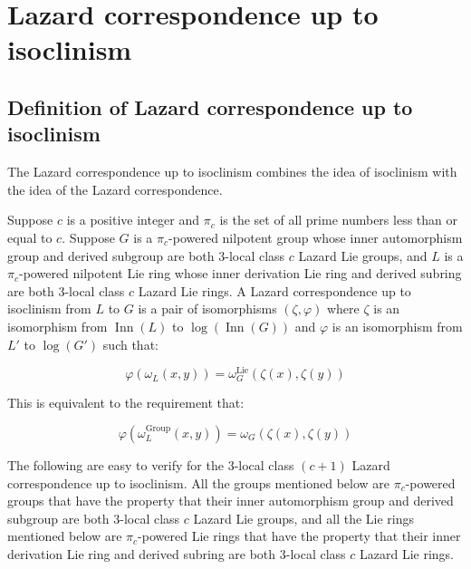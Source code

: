 
\section{Lazard correspondence up to isoclinism}\label{sec:lcuti}

\subsection{Definition of Lazard correspondence up to isoclinism}\label{sec:lcuti-def}

The Lazard correspondence up to isoclinism combines the idea of
isoclinism with the idea of the Lazard correspondence.

\begin{definer}
  Suppose $c$ is a positive integer and $\pi_c$ is the set of all
  prime numbers less than or equal to $c$. Suppose $G$ is a
  $\pi_c$-powered nilpotent group whose inner automorphism group and
  derived subgroup are both $3$-local class $c$ Lazard Lie groups, and
  $L$ is a $\pi_c$-powered nilpotent Lie ring whose inner derivation
  Lie ring and derived subring are both $3$-local class $c$ Lazard Lie
  rings. A Lazard correspondence up to isoclinism from $L$ to $G$ is a
  pair of isomorphisms $(\zeta,\varphi)$ where $\zeta$ is an
  isomorphism from $\operatorname{Inn}(L)$ to
  $\log(\operatorname{Inn}(G))$ and $\varphi$ is an isomorphism from
  $L'$ to $\log(G')$ such that:

  $$\varphi(\omega_L(x,y)) = \omega^{\text{Lie}}_G(\zeta(x),\zeta(y))$$

  This is equivalent to the requirement that:

  $$\varphi(\omega^{\text{Group}}_L(x,y)) = \omega_G(\zeta(x),\zeta(y))$$
\end{definer}

The following are easy to verify for the $3$-local class $(c + 1)$ Lazard
correspondence up to isoclinism. All the groups mentioned below are
$\pi_c$-powered groups that have the property that their inner
automorphism group and derived subgroup are both $3$-local class $c$
Lazard Lie groups, and all the Lie rings mentioned below are
$\pi_c$-powered Lie rings that have the property that their inner
derivation Lie ring and derived subring are both $3$-local class $c$
Lazard Lie rings. %


